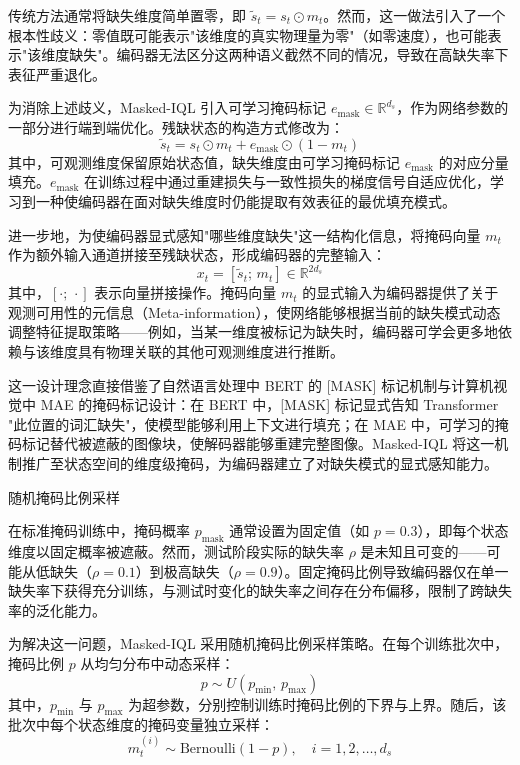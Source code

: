 传统方法通常将缺失维度简单置零，即 $\tilde{s}_t = s_t \odot m_t$。然而，这一做法引入了一个根本性歧义：零值既可能表示"该维度的真实物理量为零"（如零速度），也可能表示"该维度缺失"。编码器无法区分这两种语义截然不同的情况，导致在高缺失率下表征严重退化。

为消除上述歧义，Masked-IQL 引入可学习掩码标记 $e_{\text{mask}} \in \mathbb{R}^{d_s}$，作为网络参数的一部分进行端到端优化。残缺状态的构造方式修改为：
\begin{equation}
    \tilde{s}_t = s_t \odot m_t + e_{\text{mask}} \odot (1 - m_t)
    \label{eq:mask_token}
\end{equation}
其中，可观测维度保留原始状态值，缺失维度由可学习掩码标记 $e_{\text{mask}}$ 的对应分量填充。$e_{\text{mask}}$ 在训练过程中通过重建损失与一致性损失的梯度信号自适应优化，学习到一种使编码器在面对缺失维度时仍能提取有效表征的最优填充模式。

进一步地，为使编码器显式感知"哪些维度缺失"这一结构化信息，将掩码向量 $m_t$ 作为额外输入通道拼接至残缺状态，形成编码器的完整输入：
\begin{equation}
    x_t = [\tilde{s}_t;\, m_t] \in \mathbb{R}^{2d_s}
    \label{eq:encoder_input}
\end{equation}
其中，$[\cdot;\,\cdot]$ 表示向量拼接操作。掩码向量 $m_t$ 的显式输入为编码器提供了关于观测可用性的元信息（Meta-information），使网络能够根据当前的缺失模式动态调整特征提取策略——例如，当某一维度被标记为缺失时，编码器可学会更多地依赖与该维度具有物理关联的其他可观测维度进行推断。

这一设计理念直接借鉴了自然语言处理中 BERT\cite{devlin2019bert} 的 [MASK] 标记机制与计算机视觉中 MAE\cite{he2022masked} 的掩码标记设计：在 BERT 中，[MASK] 标记显式告知 Transformer "此位置的词汇缺失"，使模型能够利用上下文进行填充；在 MAE 中，可学习的掩码标记替代被遮蔽的图像块，使解码器能够重建完整图像。Masked-IQL 将这一机制推广至状态空间的维度级掩码，为编码器建立了对缺失模式的显式感知能力。

随机掩码比例采样

在标准掩码训练中，掩码概率 $p_{\text{mask}}$ 通常设置为固定值（如 $p = 0.3$），即每个状态维度以固定概率被遮蔽。然而，测试阶段实际的缺失率 $\rho$ 是未知且可变的——可能从低缺失（$\rho = 0.1$）到极高缺失（$\rho = 0.9$）。固定掩码比例导致编码器仅在单一缺失率下获得充分训练，与测试时变化的缺失率之间存在分布偏移，限制了跨缺失率的泛化能力。

为解决这一问题，Masked-IQL 采用随机掩码比例采样策略。在每个训练批次中，掩码比例 $p$ 从均匀分布中动态采样：
\begin{equation}
    p \sim U(p_{\min},\, p_{\max})
    \label{eq:mask_ratio_sampling}
\end{equation}
其中，$p_{\min}$ 与 $p_{\max}$ 为超参数，分别控制训练时掩码比例的下界与上界。随后，该批次中每个状态维度的掩码变量独立采样：
\begin{equation}
    m_t^{(i)} \sim \text{Bernoulli}(1 - p), \quad i = 1, 2, \ldots, d_s
\end{equation}

